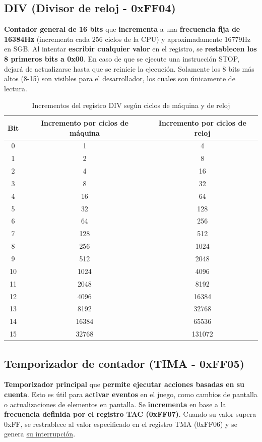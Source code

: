\subsection{DIV (Divisor de reloj - 0xFF04)}
\textbf{Contador general de 16 bits} que \textbf{incrementa} a una \textbf{frecuencia fija de 16384Hz} (incrementa cada 256 ciclos de la CPU) y aproximadamente 16779Hz en SGB. Al intentar \textbf{escribir cualquier valor} en el registro, se \textbf{restablecen los 8 primeros bits a 0x00}. En caso de que se ejecute una instrucción STOP, dejará de actualizarse hasta que se reinicie la ejecución. Solamente los 8 bits más altos (8-15) son visibles para el desarrollador, los cuales son únicamente de lectura.
\begin{table}[H]
    \centering
    \begin{tabular}{|c|c|c|}
    \hline
    \textbf{Bit} & \textbf{Incremento por ciclos de máquina} & \textbf{Incremento por ciclos de reloj} \\ \hline
    0  & 1 & 4 \\ \hline
    1  & 2 & 8 \\ \hline
    2  & 4 & 16 \\ \hline
    3  & 8  & 32 \\ \hline
    4  & 16 & 64 \\ \hline
    5  & 32 & 128 \\ \hline
    6  & 64 & 256 \\ \hline
    7  & 128 & 512 \\ \hline
    8  & 256 & 1024 \\ \hline
    9  & 512 & 2048 \\ \hline
    10 & 1024 & 4096 \\ \hline
    11 & 2048 & 8192 \\ \hline
    12 & 4096 & 16384 \\ \hline
    13 & 8192 & 32768 \\ \hline
    14 & 16384 & 65536 \\ \hline
    15 & 32768 & 131072 \\ \hline
    \end{tabular}
    \caption{Incrementos del registro DIV según ciclos de máquina y de reloj}
\end{table}

\subsection{Temporizador de contador (TIMA - 0xFF05)}
\textbf{Temporizador principal} que \textbf{permite ejecutar acciones basadas en su cuenta}. Esto es útil para \textbf{activar eventos} en el juego, como cambios de pantalla o actualizaciones de elementos en pantalla. Se \textbf{incrementa} en base a la \textbf{frecuencia definida por el registro TAC (0xFF07)}. Cuando su valor supera 0xFF, se restrablece al valor especificado en el registro TMA (0xFF06) y se genera \hyperref[interrupttype]{su interrupción}.

